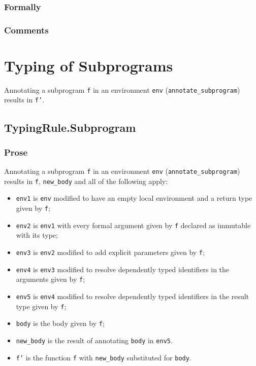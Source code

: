 \documentclass{book}
\begin{document}
  \subsection{Formally}

  \subsection{Comments}

\chapter{Typing of Subprograms}

Annotating a subprogram \texttt{f} in an environment \texttt{env}
(\texttt{annotate\_subprogram}) results in \texttt{f'}.

\section{TypingRule.Subprogram \label{sec:TypingRule.Subprogram}}

  \subsection{Prose}
Annotating a subprogram \texttt{f} in an environment \texttt{env}
(\texttt{annotate\_subprogram}) results in \texttt{f}, \texttt{new\_body} and all of
the following apply:
 \begin{itemize}
   \item \texttt{env1} is \texttt{env} modified to have an empty local
     environment and a return type given by \texttt{f};
   \item \texttt{env2} is \texttt{env1} with every formal argument given by
     \texttt{f} declared as immutable with its type;
   \item \texttt{env3} is \texttt{env2} modified to add explicit parameters
     given by \texttt{f};
   \item \texttt{env4} is \texttt{env3} modified to resolve dependently typed
     identifiers in the arguments given by \texttt{f};
   \item \texttt{env5} is \texttt{env4} modified to resolve dependently typed
     identifiers in the result type given by \texttt{f};
   \item \texttt{body} is the body given by \texttt{f};
   \item \texttt{new\_body} is the result of annotating \texttt{body} in
     \texttt{env5}.
   \item \texttt{f'} is the function \texttt{f} with \texttt{new\_body} substituted for \texttt{body}.
 \end{itemize} 
\end{document}

